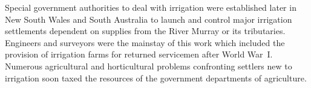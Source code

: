 Special government authorities to deal with irrigation were
established later in New South Wales and South Australia to launch and
control major irrigation settlements dependent on supplies from the
River Murray or its tributaries.  Engineers and surveyors were the
mainstay of this work which included the provision of irrigation farms
for returned servicemen after World War~I.  Numerous agricultural and
horticultural problems confronting settlers new to irrigation soon
taxed the resources of the government departments of agriculture.

